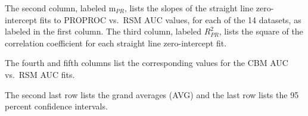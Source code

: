 \documentclass[
]{book}
\begin{document}
\begin{table}[H]

\caption{\label{tab:rsm-3-fits-slopes-table1}Summary of slopes and correlations for the two zero-intercept fits: PROPROC AUC vs. RSM AUC and CBM AUC vs. RSM AUC. The average of each slope equals unity to within 0.6 percent.}
\centering
{}
\end{table}

The second column, labeled \(\text{m}_{PR}\), lists the slopes of the straight line zero-intercept fits to PROPROC vs.~RSM AUC values, for each of the 14 datasets, as labeled in the first column. The third column, labeled \(R^2_{PR}\), lists the square of the correlation coefficient for each straight line zero-intercept fit.

The fourth and fifth columns list the corresponding values for the CBM AUC vs.~RSM AUC fits.

The second last row lists the grand averages (AVG) and the last row lists the 95 percent confidence intervals.
\end{document}
